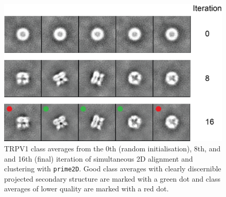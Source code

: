 \documentclass[a4paper,11pt]{article}
\newcommand{\prgname}[1]{\textcolor{NavyBlue}{\texttt{#1}}}
\begin{document}
\begin{figure}
\includegraphics[keepaspectratio=true,scale=0.8]{./trpv1iters/trpv1iters}
\caption{TRPV1 class averages from the 0th (random initialisation), 8th, and and 16th (final) iteration of simultaneous 2D alignment and clustering with \prgname{prime2D}. Good class averages with clearly discernible projected secondary structure are marked with a green dot and class averages of lower quality are marked with a red dot.}
\end{figure}
\end{document}

